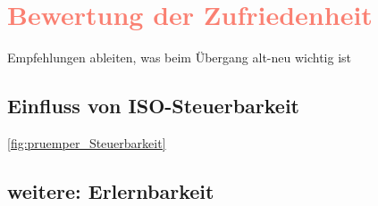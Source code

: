 \section{\textcolor{Salmon}{Bewertung der Zufriedenheit}}
Empfehlungen ableiten, was beim Übergang alt-neu wichtig ist




\subsection*{Einfluss von ISO-Steuerbarkeit}
\autoref{fig:pruemper_Steuerbarkeit}

\subsection*{weitere: Erlernbarkeit}
